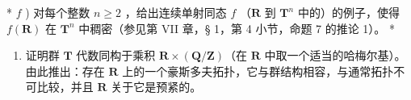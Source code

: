 * \(f\) ) 对每个整数 \(n \geqslant 2\) ，给出连续单射同态 \(f\) （\(\mathbf{R}\) 到 \(\mathbf{T}^n\) 中的）的例子，使得 \(f(\mathbf{R})\) 在 \(\mathbf{T}^n\) 中稠密（参见第 VII 章，§ 1，第 4 小节，命题 7 的推论 1）。 *

\begin{enumerate}
\def\labelenumi{\arabic{enumi})}
\setcounter{enumi}{2}
\tightlist
\item
  证明群 \(\mathbf{T}\) 代数同构于乘积 \(\mathbf{R} \times (\mathbf{Q}/\mathbf{Z})\)（在 \(\mathbf{R}\) 中取一个适当的哈梅尔基）。由此推出：存在 \(\mathbf{R}\) 上的一个豪斯多夫拓扑，它与群结构相容，与通常拓扑不可比较，并且 \(\mathbf{R}\) 关于它是预紧的。
\end{enumerate}

